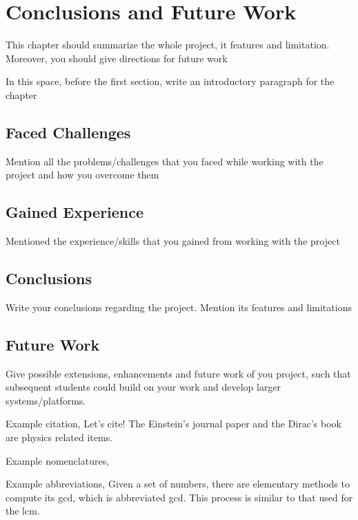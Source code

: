 \chapter{Conclusions and Future Work}

This chapter should summarize the whole project, it features and limitation. Moreover, you should give directions for future work

In this space, before the first section, write an introductory paragraph for the chapter

\section{Faced Challenges}
Mention all the problems/challenges that you faced while working with the project and how you overcome them

\section{Gained Experience}
Mentioned the experience/skills that you gained from working with the project

\section{Conclusions}
Write your conclusions regarding the project. Mention its features and limitations

\section{Future Work}
Give possible extensions, enhancements and future work of you project, such that subsequent students could build on your work and develop larger systems/platforms.

Example citation, Let's cite! The Einstein's journal paper \cite{einstein} and the Dirac's 
book \cite{dirac} are physics related items. 


Example nomenclatures, 

Example abbreviations, Given a set of numbers, there are elementary methods to compute its \acrlong{gcd}, which is abbreviated \acrshort{gcd}. This process is similar to that used for the \acrfull{lcm}.

\printbibliography
